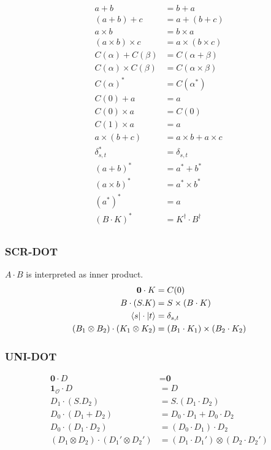 \begin{align*}
    a + b & = b + a \\
    (a + b) + c & = a + (b + c) \\
    a \times b & = b \times a \\
    (a \times b) \times c & = a \times (b \times c) \\
    C(\alpha) + C(\beta) & = C(\alpha + \beta) \\
    C(\alpha) \times C(\beta) & = C(\alpha \times \beta) \\
    C(\alpha)^* & = C(\alpha^*) \\
    C(0) + a & = a \\
    C(0) \times a & = C(0) \\
    C(1) \times a & = a \\
    a \times (b + c) & = a \times b + a \times c \\
    \delta_{s, t}^* & = \delta_{s, t} \\
    (a + b)^* & = a^* + b^* \\
    (a \times b)^* & = a^* \times b^* \\
    (a^*)^* & = a \\
    (B \cdot K)^* & = K^\dagger \cdot B^\dagger \\
  \end{align*}

\subsubsection*{\textsf{SCR-DOT}}
$A \cdot B$ is interpreted as inner product.
\begin{align*}
    \mathbf{0} \cdot K & = C(0) \\
    B \cdot (S.K) & = S \times (B \cdot K) \\
    \langle s| \cdot |t\rangle & = \delta_{s, t} \\
    (B_1 \otimes B_2) \cdot (K_1 \otimes K_2) & = (B_1 \cdot K_1) \times (B_2 \cdot K_2) \\
\end{align*}

\subsubsection*{\textsf{UNI-DOT}}
\begin{align*}
    \textbf{0} \cdot D & = \textbf{0} \\
    \textbf{1}_\mathcal{O} \cdot D & = D \\
    D_1 \cdot (S.D_2) & = S.(D_1 \cdot D_2) \\
    D_0 \cdot (D_1 + D_2) & = D_0 \cdot D_1 + D_0 \cdot D_2 \\
    D_0 \cdot (D_1 \cdot D_2) & = (D_0 \cdot D_1) \cdot D_2 \\
    (D_1 \otimes D_2) \cdot (D_1' \otimes D_2') & = (D_1 \cdot D_1') \otimes (D_2 \cdot D_2')
\end{align*}

